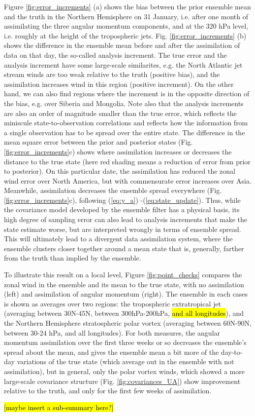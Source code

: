 Figure \ref{fig:error_increments} (a) shows the bias between the prior ensemble mean and the truth in the Northern Hemisphere on 31 January, i.e. after one month of assimilating the three angular momentum components, and at the 320 hPa level, i.e. roughly at the height of the tropospheric jets. 
Fig. \ref{fig:error_increments} (b) shows the difference in the ensemble mean before and after the assimilation of data on that day, the so-called analysis increment. 
The true error and the analysis increment have some large-scale similarites, e.g. the North Atlantic jet stream winds are too weak relative to the truth (positive bias), and the assimilation increases wind in this region (positive increment). 
On the other hand, we can also find regions where the increment is in the opposite direction of the bias, e.g. over Siberia and Mongolia. 
Note also that the analysis increments are also an order of magnitude smaller than the true error, which reflects the miniscule state-to-observation correlations and reflects how the information from a single observation has to be spread over the entire state.
The difference in the mean square error between the prior and posterior states (Fig. \ref{fig:error_increments}c) shows where assimilation increases or decreases the distance to the true state (here red shading means a reduction of error from prior to posterior).  
On this particular date, the assimilation has reduced the zonal wind error over North America, but with commensurate error increases over Asia. 
Meanwhile, assimilation decreases the ensemble spread everywhere (Fig. \ref{fig:error_increments}c), following (\ref{eq:y_a}) -(\ref{eq:state_update}).  
Thus, while the covariance model developed by the ensemble filter has a physical basis, its high degree of sampling error can also lead to analysis increments that make the state estimate worse, but are interpreted wrongly in terms of ensemble spread. 
This will ultimately lead to a divergent data assimilation system, where the ensemble clusters closer together around a mean state that is, generally, farther from the truth than implied by the ensemble. 


To illustrate this result on a local level, Figure \ref{fig:point_checks} compares the zonal wind in the ensemble and its mean to the true state, with no assimilation (left) and assimilation of angular momentum (right). 
The ensemble in each cases is shown as averages over two regions: the tropospheric extratropical jet (averaging between 30N-45N, between 300hPa-200hPa, \hl{and all longitudes}), and the Northern Hemisphere stratospheric polar vortex (averaging between 60N-90N, between 30-24 hPa, and all longitudes).
For both measures, the angular momentum assimilation over the first three weeks or so decreases the ensemble's spread about the mean, and gives the ensemble mean a bit more of the day-to-day variations of the true state (which average out in the ensemble with not assimilation), but in general, only the polar vortex winds, which showed a more large-scale covariance structure (Fig. \ref{fig:covariances_UA}) show improvement relative to the truth, and only for the first few weeks of assimilation. 

\hl{[maybe insert a sub-summary here?]}
